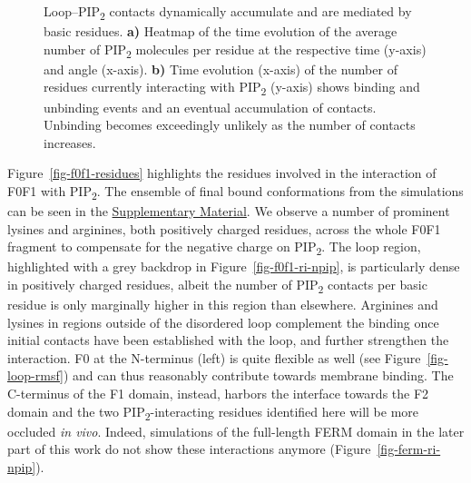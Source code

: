 \documentclass[
  twocolumn]{biophys-new-mod}
\begin{document}
\begin{figure}
\begin{minipage}[t]{\linewidth}
{{}

}

\subcaption{\label{fig-f0f1-retention}~}
\end{minipage}%

\caption{\label{fig-loop-importance-2}Loop--PIP\textsubscript{2}
contacts dynamically accumulate and are mediated by basic residues.
\textbf{a)} Heatmap of the time evolution of the average number of
PIP\textsubscript{2} molecules per residue at the respective time
(y-axis) and angle (x-axis). \textbf{b)} Time evolution (x-axis) of the
number of residues currently interacting with PIP\textsubscript{2}
(y-axis) shows binding and unbinding events and an eventual accumulation
of contacts. Unbinding becomes exceedingly unlikely as the number of
contacts increases.}

\end{figure}

Figure~\ref{fig-f0f1-residues} highlights the residues involved in the
interaction of F0F1 with PIP\textsubscript{2}. The ensemble of final
bound conformations from the simulations can be seen in the
\protect\hyperlink{sec-system}{Supplementary Material}. We observe a
number of prominent lysines and arginines, both positively charged
residues, across the whole F0F1 fragment to compensate for the negative
charge on PIP\textsubscript{2}. The loop region, highlighted with a grey
backdrop in Figure~\ref{fig-f0f1-ri-npip}, is particularly dense in
positively charged residues, albeit the number of PIP\textsubscript{2}
contacts per basic residue is only marginally higher in this region than
elsewhere. Arginines and lysines in regions outside of the disordered
loop complement the binding once initial contacts have been established
with the loop, and further strengthen the interaction. F0 at the
N-terminus (left) is quite flexible as well (see
Figure~\ref{fig-loop-rmsf}) and can thus reasonably contribute towards
membrane binding. The C-terminus of the F1 domain, instead, harbors the
interface towards the F2 domain and the two
PIP\textsubscript{2}-interacting residues identified here will be more
occluded \emph{in vivo}. Indeed, simulations of the full-length FERM
domain in the later part of this work do not show these interactions
anymore (Figure~\ref{fig-ferm-ri-npip}).
\end{document}

